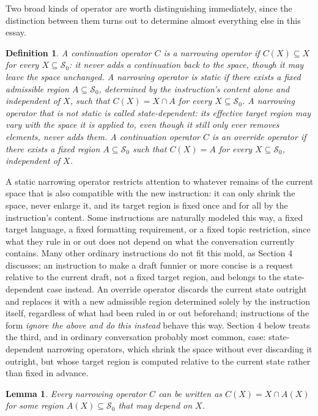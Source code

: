 \documentclass[11pt]{article}
\newtheorem{lemma}{Lemma}
\newtheorem{definition}{Definition}
\begin{document}
Two broad kinds of operator are worth distinguishing immediately, since the distinction between them turns out to determine almost everything else in this essay.

\begin{definition}
A continuation operator $C$ is a \emph{narrowing} operator if $C(X) \subseteq X$ for every $X \subseteq \mathcal{S}_0$: it never adds a continuation back to the space, though it may leave the space unchanged. A narrowing operator is \emph{static} if there exists a fixed admissible region $A \subseteq \mathcal{S}_0$, determined by the instruction's content alone and independent of $X$, such that $C(X) = X \cap A$ for every $X \subseteq \mathcal{S}_0$. A narrowing operator that is not static is called \emph{state-dependent}: its effective target region may vary with the space it is applied to, even though it still only ever removes elements, never adds them. A continuation operator $C$ is an \emph{override} operator if there exists a fixed region $A \subseteq \mathcal{S}_0$ such that $C(X) = A$ for every $X \subseteq \mathcal{S}_0$, independent of $X$.
\end{definition}

A static narrowing operator restricts attention to whatever remains of the current space that is also compatible with the new instruction: it can only shrink the space, never enlarge it, and its target region is fixed once and for all by the instruction's content. Some instructions are naturally modeled this way, a fixed target language, a fixed formatting requirement, or a fixed topic restriction, since what they rule in or out does not depend on what the conversation currently contains. Many other ordinary instructions do not fit this mold, as Section 4 discusses; an instruction to make a draft funnier or more concise is a request relative to the current draft, not a fixed target region, and belongs to the state-dependent case instead. An override operator discards the current state outright and replaces it with a new admissible region determined solely by the instruction itself, regardless of what had been ruled in or out beforehand; instructions of the form \emph{ignore the above and do this instead} behave this way. Section 4 below treats the third, and in ordinary conversation probably most common, case: state-dependent narrowing operators, which shrink the space without ever discarding it outright, but whose target region is computed relative to the current state rather than fixed in advance.

\begin{lemma}
Every narrowing operator $C$ can be written as $C(X) = X \cap A(X)$ for some region $A(X) \subseteq \mathcal{S}_0$ that may depend on $X$.
\end{lemma}
\end{document}
